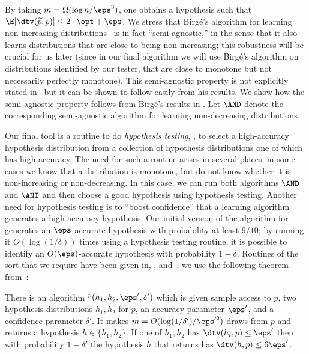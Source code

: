 By taking $m = \Omega (\log n / \eps^3)$, one obtains a hypothesis such that
$\E[\dtv(\widetilde{p},p)] \leq 2 \cdot \opt + \eps$.
We stress that Birg\'{e}'s algorithm for learning non-increasing distributions~\cite{Birge:87b}
is in fact ``semi-agnostic,'' in the sense that it also learns distributions that are close
to being non-increasing; this robustness will be crucial for us later (since in our final
algorithm we will use Birg\'{e}'s algorithm on distributions identified
by our tester, that are close to monotone but not necessarily perfectly
monotone). This semi-agnostic property is not explicitly stated in~\cite{Birge:87b}
but it can be shown to follow easily from his results. We show how
the semi-agnostic property follows from Birg\'{e}'s results in
.
Let $\AND$ denote the corresponding semi-agnostic algorithm for learning non-decreasing distributions.

Our final tool is a routine to do \emph{hypothesis testing}, \ie, to select a
high-accuracy hypothesis distribution from a collection of hypothesis distributions one
of which has high accuracy.  The need for such a routine arises in several places; in
some cases we know that a distribution is monotone, but do not know whether it is
non-increasing or non-decreasing. In this case, we can run both algorithms $\AND$ and
$\ANI$ and then choose a good hypothesis using hypothesis testing.  Another need for
hypothesis testing is to ``boost confidence'' that a learning algorithm generates a
high-accuracy hypothesis.  Our initial version of the algorithm for
 generates an $\eps$-accurate hypothesis with probability at least
$9/10$; by running it $O(\log(1/\delta))$ times using a hypothesis testing
routine,
it is possible to identify an $O(\eps)$-accurate hypothesis with probability $1-\delta$.
Routines of the sort that we require have been given in, \eg, \cite{DL:01} and~\cite{DDS12stoclong}; we use the following theorem from~\cite{DDS12stoclong}:

%

\begin{theorem} \label{thm:choosehypothesis}
There is an algorithm $^p({h}_1,{h}_2,\eps',\delta')$ which is given
{sample} access to $p$, two hypothesis distributions $h_1,h_2$ for $p$,  an accuracy parameter
$\eps'$, and a confidence parameter $\delta'$.  It makes $m=O(\log(1/\delta')/\eps'^2)$ draws
from $p$ and returns a hypothesis $h \in \{h_1,h_2\}$.  If one of $h_1,h_2$ has
$\dtv(h_i,p) \leq \eps'$ then with probability $1-\delta'$ the hypothesis $h$ that
 returns has $\dtv(h,p) \leq 6 \eps'$.
\end{theorem}

